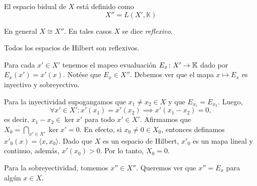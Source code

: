 \begin{Definicion}\label{def:bidual}
	El espacio bidual de \(X\) está definido como
	\begin{equation*}
		X'' = L(X', \mathbb{K})
	\end{equation*}
\end{Definicion}

En general \(X \cong X''\). En tales casos \(X\) se dice \textit{reflexivo}.

\begin{Proposicion}\label{prop:hilbert_reflexivo}
	Todos los espacios de Hilbert son reflexivos.
\end{Proposicion}
\begin{Demostracion}
Para cada \(x' \in X'\) tenemos el mapeo evualuación \(E_x\colon X' \to \mathbb{K}\)
dado por \(E_x(x') = x'(x)\). Notése que \(E_{x} \in X''\). Debemos ver que el
mapa \(x\mapsto E_x\) es inyectivo y sobreyectivo.

Para la inyectividad supogangamos que \(x_1 \ne x_2\in X\) y que \(E_{x_1} =
E_{x_2}\). Luego,
\begin{displaymath}
	\forall x'\in X'\colon
	x'(x_1) = x'(x_2)
	\implies
	x'(x_1 - x_2) = 0,
\end{displaymath}
es decir, \(x_1 - x_2 \in \ker x'\) para todo \(x'\in X'\). Afirmamos que
\(X_0 = \bigcap_{x'\in X'} \ker x' = 0\). En efecto, si \(x_0 \ne 0 \in X_0\),
entonces definamos \(x'_{0}(x) = \langle x, x_0 \rangle\). Dado que \(X\) es un
espacio de Hilbert, \(x'_0\) es un mapa lineal y continuo, además, \(x'(x_0) >
0\). Por lo tanto, \(X_0 = 0\).

Para la sobreyectividad, tomemos \(x'' \in X''\). Queremos ver que \(x'' =
E_{x}\) para algún \(x\in X\).
\end{Demostracion}

